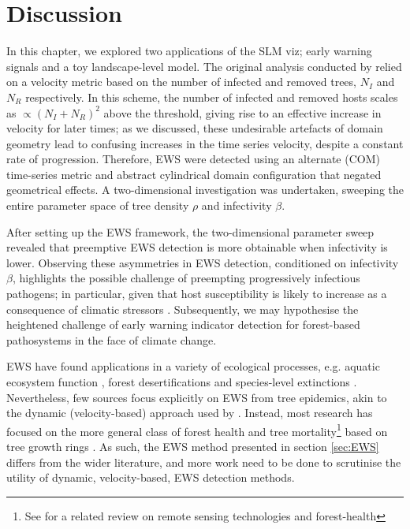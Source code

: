 \newpage

\section{Discussion}
\label{sec:ch4-discussion}

In this chapter, we explored two applications of the SLM viz; early warning signals and a toy landscape-level model.
The original analysis conducted by \cite{OROZCOFUENTES201912} relied on a velocity metric based on the number of 
infected and removed trees, $N_I$ and $N_R$ respectively. In this scheme, the number of infected and removed hosts scales as
$\propto (N_I + N_R)^2$ above the threshold, giving rise to an effective increase in velocity for later times;
as we discussed, these undesirable artefacts of domain geometry lead to confusing increases in the time series velocity, 
despite a constant rate of progression. Therefore, EWS were detected using an alternate (COM) time-series metric and abstract 
cylindrical domain configuration that negated geometrical effects.
A two-dimensional investigation was undertaken, sweeping the entire parameter space of tree density $\rho$ and infectivity $\beta$.

After setting up the EWS framework, the two-dimensional parameter sweep revealed that preemptive EWS detection is more obtainable 
when infectivity is lower. Observing these asymmetries in EWS detection, conditioned on infectivity
$\beta$, highlights the possible challenge of preempting progressively infectious pathogens;
in particular, given that host susceptibility is likely to increase as a consequence of climatic stressors \cite{garrett2006climate}.
Subsequently, we may hypothesise the heightened challenge of early warning indicator detection for forest-based pathosystems in the face of climate change.

EWS have found applications in a variety of ecological processes, 
e.g. aquatic ecosystem function \cite{kramer1991aquatic}, forest desertifications \cite{yang2005desertification}
and species-level extinctions \cite{drake2010early}.
Nevertheless, few sources focus explicitly on EWS from tree epidemics, akin to the dynamic (velocity-based) 
approach used by \cite{OROZCOFUENTES201912}. Instead, most research has focused on the more general class of forest
health and tree mortality\footnote{ 
See \cite{torres2021role} for a related review on remote sensing technologies and forest-health
} based on tree growth rings \cite{rogers2018detecting, mamet2015tree}. 
As such, the EWS method presented in section \ref{sec:EWS} differs from the wider literature,
and more work need to be done to scrutinise the utility of dynamic, velocity-based, EWS detection methods.

